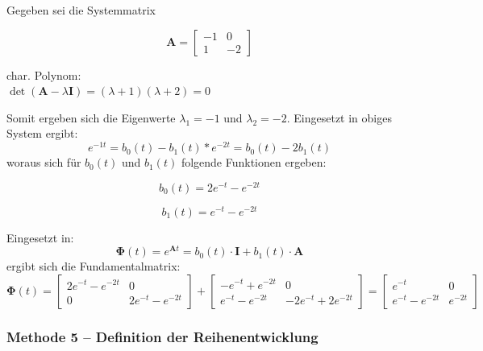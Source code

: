 Gegeben sei die Systemmatrix
\begin{center}
\begin{minipage}[t]{0.48\columnwidth}
    \vspace{-0.05cm}
    $$\bm{A} = \begin{bmatrix*} -1 & 0 \\ 1 & -2 \end{bmatrix*}$$
\end{minipage}
\hfill
\begin{minipage}[t]{0.48\columnwidth}
    \vspace{0cm}
    char. Polynom: \\
    \(\det(\bm{A} - \lambda \bm{I}) = (\lambda + 1)(\lambda + 2) = 0\)
\end{minipage}
\end{center}
\vspace{0.2cm}
Somit ergeben sich die Eigenwerte $\lambda_1 = -1$ und $\lambda_2 = -2$.
Eingesetzt in obiges System ergibt:
$$ e^{-1t} = b_0(t) - b_1(t)*e^{-2t} = b_0(t) - 2b_1(t) $$
woraus sich für $b_0(t)$ und $b_1(t)$ folgende Funktionen ergeben:
\begin{center}
\begin{minipage}[t]{0.48\columnwidth}
    \vspace{-0.25cm}
    $$ b_0(t) = 2e^{-t} - e^{-2t} $$
\end{minipage}
\hfill
\begin{minipage}[t]{0.48\columnwidth}
    \vspace{-0.25cm}
    $$ b_1(t) = e^{-t} - e^{-2t}$$
\end{minipage}
\end{center}
Eingesetzt in: $$ \bm{\Phi}(t) = e^{\bm{A}t} = b_0(t) \cdot \bm{I} + b_1(t) \cdot \bm{A} $$
ergibt sich die Fundamentalmatrix:
$$ \bm{\Phi}(t) = \begin{bmatrix*} 2e^{-t} - e^{-2t} & 0 \\ 0 & 2e^{-t} - e^{-2t} \end{bmatrix*} +  
\begin{bmatrix*} -e^{-t} + e^{-2t} & 0 \\ e^{-t} - e^{-2t} & -2e^{-t} + 2e^{-2t} \end{bmatrix*} 
= \begin{bmatrix*} e^{-t} & 0 \\ e^{-t} - e^{-2t} & e^{-2t} \end{bmatrix*} $$

\subsubsection{Methode 5 -- Definition der Reihenentwicklung}

